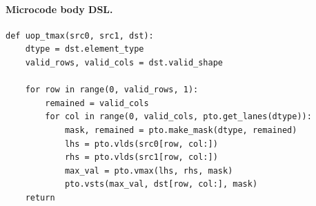 \paragraph{Microcode body DSL.}
\begin{lstlisting}[style=ptocode]
def uop_tmax(src0, src1, dst):
    dtype = dst.element_type
    valid_rows, valid_cols = dst.valid_shape

    for row in range(0, valid_rows, 1):
        remained = valid_cols
        for col in range(0, valid_cols, pto.get_lanes(dtype)):
            mask, remained = pto.make_mask(dtype, remained)
            lhs = pto.vlds(src0[row, col:])
            rhs = pto.vlds(src1[row, col:])
            max_val = pto.vmax(lhs, rhs, mask)
            pto.vsts(max_val, dst[row, col:], mask)
    return
\end{lstlisting}
\Needspace{0.34\textheight}
